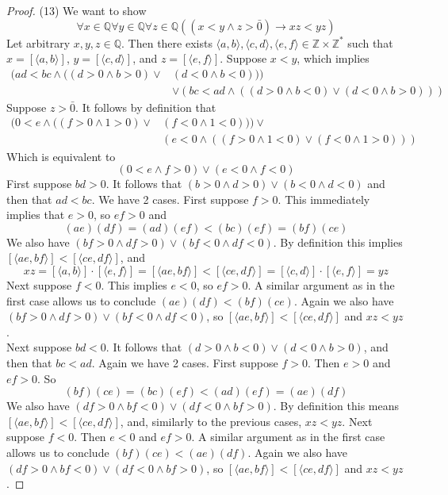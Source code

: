 \documentclass{report}
\begin{document}
\begin{proof}(13)
We want to show
\begin{equation*}
\forall x\in\mathbb Q\forall y\in\mathbb Q\forall z\in\mathbb Q((x<y\land z>\bar0)\to xz<yz)
\end{equation*}
Let arbitrary $x,y,z\in\mathbb Q$. Then there exists $\langle a,b\rangle,\langle c,d\rangle,\langle e,f\rangle\in\mathbb Z\times\mathbb Z^*$ such that 
$x=[\langle a,b\rangle]$, $y=[\langle c,d\rangle]$, and $z=[\langle e,f\rangle]$. Suppose $x<y$, which implies
\begin{align*}
(ad<bc\land((d>0\land b>0)\lor&(d<0\land b<0)))\\
&\lor(bc<ad\land((d>0\land b<0)\lor(d<0\land b>0)))
\end{align*}
Suppose $z>\bar0$. It follows by definition that
\begin{align*}
(0<e\land((f>0\land 1>0)\lor&(f<0\land 1<0)))\lor\\
&(e<0\land((f>0\land 1<0)\lor(f<0\land 1>0)))
\end{align*}
Which is equivalent to 
\begin{equation*}
(0<e\land f>0)\lor(e<0\land f<0)
\end{equation*}
First suppose $bd>0$. It follows that $(b>0\land d>0)\lor(b<0\land d<0)$ and then that $ad<bc$.
We have 2 cases. First suppose $f>0$. This immediately implies that $e>0$, so $ef>0$ and
\begin{equation*}
(ae)(df)=(ad)(ef)<(bc)(ef)=(bf)(ce)
\end{equation*}
We also have $(bf>0\land df>0)\lor(bf<0\land df<0)$. By definition this implies $[\langle ae,bf\rangle]<[\langle ce,df\rangle]$, and
\begin{equation*}
xz=[\langle a,b\rangle]\cdot[\langle e,f\rangle]=[\langle ae,bf\rangle]<[\langle ce,df\rangle]=
[\langle c,d\rangle]\cdot[\langle e,f\rangle]=yz
\end{equation*}
Next suppose $f<0$. This implies $e<0$, so $ef>0$. A similar argument as in the first case allows us to conclude $(ae)(df)<(bf)(ce)$. Again we also have $(bf>0\land df>0)\lor(bf<0\land df<0)$, 
so $[\langle ae,bf\rangle]<[\langle ce,df\rangle]$ and $xz<yz$.\\
\indent Next suppose $bd<0$. It follows that $(d>0\land b<0)\lor(d<0\land b>0)$, and then that $bc<ad$. Again we have 2 cases. First suppose $f>0$. Then $e>0$ and $ef>0$. So
\begin{equation*}
(bf)(ce)=(bc)(ef)<(ad)(ef)=(ae)(df)
\end{equation*}
We also have $(df>0\land bf<0)\lor(df<0\land bf>0)$. By definition this means 
$[\langle ae,bf\rangle]<[\langle ce,df\rangle]$, and, similarly to the previous cases, $xz<yz$. Next suppose $f<0$. Then $e<0$ and $ef>0$. 
A similar argument as in the first case allows us to conclude $(bf)(ce)<(ae)(df)$. Again we also have $(df>0\land bf<0)\lor(df<0\land bf>0)$, so 
$[\langle ae,bf\rangle]<[\langle ce,df\rangle]$ and $xz<yz$.
\end{proof}
\end{document}
